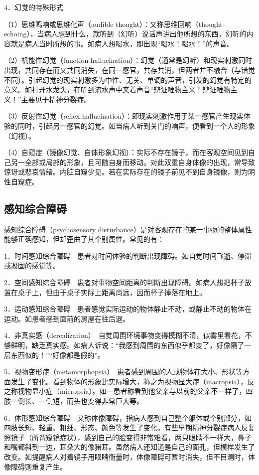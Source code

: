 4．幻觉的特殊形式

（1）思维鸣响或思维化声（audible
thought）：又称思维回响（thought-echoing），当病人想到什么，就听到（幻听）说话声讲出他所想的东西，幻听的内容就是病人当时所想的事。如病人想喝水，即出现“喝水！喝水！”的声音。

（2）机能性幻觉（function
hallucination）：幻觉（通常是幻听）和现实刺激同时出现，共同存在而又共同消失，在同一感官，共存共消，但两者并不融合（与错觉不同）。引起幻觉的现实刺激多为中性、无关、单调的声音，引发的幻觉有特定的意义。如打开水龙头，在听到流水声中夹着声音“辩证唯物主义！辩证唯物主义！”主要见于精神分裂症。

（3）反射性幻觉（reflex
hallucination）：即现实刺激作用于某一感官产生现实体验的同时，引起另一感官的幻觉。如当病人听到关门的响声，便看到一个人的形象（幻视）。

（4）自窥症（镜像幻觉、自体形象幻视）：实际不存在镜子，而在客观空间见到自己另一全部或局部的形象，且可随自身而移动。对此双重自身体像的出现，常导致惊讶或悲哀情绪。内脏自窥少见。若在实际存在的镜子前见不到自身镜像，则为阴性自窥症。

\subsection{感知综合障碍}

感知综合障碍（psychosensory
disturbance）是对客观存在的某一事物的整体属性能够正确感知，但却歪曲了其个别属性。常见的有：

1．时间感知综合障碍　患者对时间体验的判断出现障碍。如自觉时间飞逝、停滞或凝固的感觉等。

2．空间感知综合障碍　患者对事物空间距离的判断出现障碍。如病人想把杯子放置在桌子上，但由于桌子实际上距离尚远，因而杯子掉落在地上。

3．运动感知综合障碍　患者感觉实际运动的物体静止不动，或静止不动的物体在运动。如患者感到面前的房屋在往后退。

4．非真实感（derealization）　自觉周围环境事物变得模糊不清，似雾里看花，不够鲜明，缺乏真实感。如病人诉说：“我感到周围的东西似乎都变了，好像隔了一层东西似的！”“好像都是假的”。

5．视物变形症（metamorphopsia）　患者感到周围的人或物体在大小、形状等方面发生了变化。看到物体的形象比实际增大，称之为视物显大症（macropsia），反之称视物显小症（micropsia）。如一患者称看到他父亲与以前的父亲不一样了，四肢一侧长、一侧短，而头也变得非常巨大等。

6．体形感知综合障碍　又称体像障碍，指病人感到自己整个躯体或个别部分，如四肢长短、轻重、粗细、形态、颜色等发生了变化。有些早期精神分裂症病人反复照镜子（所谓窥镜症状），感到自己的脸变得非常难看，两只眼睛不一样大，鼻子和嘴都斜到一边，耳朵大的像猪耳。虽然病人还知道是自己的面孔，但模样发生了改变。如提醒病人对着镜子用眼睛衡量时，体像障碍可暂时消失，但不目测时，体像障碍则重复产生。

